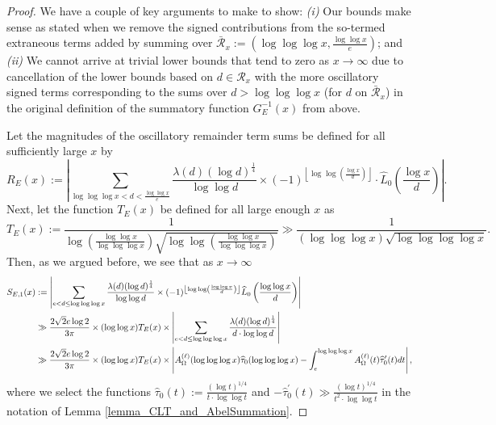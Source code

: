 \documentclass[11pt,reqno,a4letter]{article}
\numberwithin{figure}{section}
\numberwithin{table}{section}
\newcommand{\floor}[1]{\left\lfloor #1 \right\rfloor}
\theoremstyle{plain}
\numberwithin{theorem}{section}
\theoremstyle{definition}
\begin{document}
\begin{proof}
We have a couple of key arguments to make to show: 
\textit{(i)} Our bounds make sense as stated when we remove the signed contributions from the 
so-termed extraneous terms added by summing over 
$\bar{\mathcal{R}}_x := \left(\log\log\log x, \frac{\log\log x}{e}\right)$; and 
\textit{(ii)} We cannot 
arrive at trivial lower bounds that tend to zero as $x \rightarrow \infty$ due to cancellation of the 
lower bounds based on $d \in \mathcal{R}_x$ with the more oscillatory 
signed terms corresponding to the sums over 
$d > \log\log\log x$ (for $d$ on $\bar{\mathcal{R}}_x$) 
in the original definition of the summatory function $G_E^{-1}(x)$ from above. 

Let the magnitudes of the oscillatory remainder term sums be defined for all sufficiently large $x$ by 
\[
R_E(x) := \left\lvert \sum_{\log\log\log x < d < \frac{\log\log x}{e}} 
     \frac{\lambda(d) (\log d)^{\frac{1}{4}}}{\log\log d} \times 
     (-1)^{\floor{\log\log\left(\frac{\log x}{d}\right)}} \cdot 
     \widehat{L}_0\left(\frac{\log x}{d}\right) \right\rvert. 
\]
Next, let the function $T_E(x)$ be defined for all large enough $x$ as 
\begin{equation} 
\label{eqn_proof_tag_TExFuncDefAndBounds_v1} 
T_E(x) := \frac{1}{\log\left(\frac{\log\log x}{\log\log\log x}\right) 
     \sqrt{\log\log\left(\frac{\log\log x}{\log\log\log x}\right)}} \gg 
     \frac{1}{(\log\log\log x) \sqrt{\log\log\log\log x}}. 
\end{equation} 
Then, as we argued before, we see that as $x \rightarrow \infty$ 
\begin{align} 
\notag 
S_{E,1}(x) & := \left\lvert \sum_{e < d \leq \log\log\log x} 
     \frac{\lambda(d) (\log d)^{\frac{1}{4}}}{\log\log d} \times 
     (-1)^{\floor{\log\log\left(\frac{\log\log x}{d}\right)}} 
     \widehat{L}_0\left(\frac{\log\log x}{d}\right) 
     \right\rvert \\ 
\label{eqn_proof_tag_SE1xFuncExp_v1} 
     & \gg \frac{2\sqrt{2} e \log 2}{3\pi} \times (\log\log x) T_E(x) \times 
     \left\lvert \sum_{e < d \leq \log\log\log x} 
     \frac{\lambda(d) (\log d)^{\frac{1}{4}}}{d \cdot \log\log d} 
     \right\rvert \\ 
\notag 
     & \gg \frac{2\sqrt{2} e \log 2}{3\pi} \times (\log\log x) T_E(x) \times 
     \left\lvert A_{\Omega}^{(\ell)}(\log\log\log x) \widehat{\tau}_0(\log\log\log x) - 
     \int_e^{\log\log\log x} A_{\Omega}^{(\ell)}(t) \widehat{\tau}_0^{\prime}(t) dt 
     \right\rvert, 
\end{align} 
where we select the functions $\widehat{\tau}_0(t) := \frac{(\log t)^{1/4}}{t \cdot \log\log t}$ and 
$-\widehat{\tau}^{\prime}_0(t) \gg \frac{(\log t)^{1/4}}{t^2 \cdot \log\log t}$ in the notation of 
Lemma \ref{lemma_CLT_and_AbelSummation}. 


\end{proof}
\end{document}

